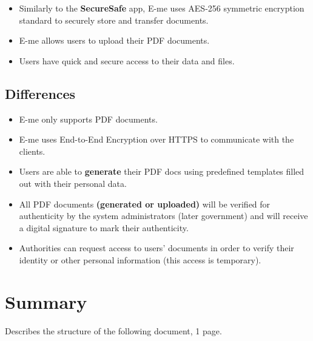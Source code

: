         \begin{itemize}
            \item Similarly to the \textbf{SecureSafe} app, E-me uses AES-256 symmetric encryption standard to securely store and transfer documents.
            \item E-me allows users to upload their PDF documents.
            \item Users have quick and secure access to their data and files.
        \end{itemize}

    \subsection{Differences}

        \begin{itemize}
            \item E-me only supports PDF documents.
            \item E-me uses End-to-End Encryption over HTTPS to communicate with the clients.
            \item Users are able to \textbf{generate} their PDF docs using predefined templates filled out with their personal data.
            \item All PDF documents \textbf{(generated or uploaded)} will be verified for authenticity by the system administrators (later government) and will receive a digital signature to mark their authenticity.
            \item Authorities can request access to users' documents in order to verify their identity or other personal information (this access is temporary). 
        \end{itemize}

\section{Summary}\label{sec:INTRO:sum}
Describes the structure of the following document, 1 page.
